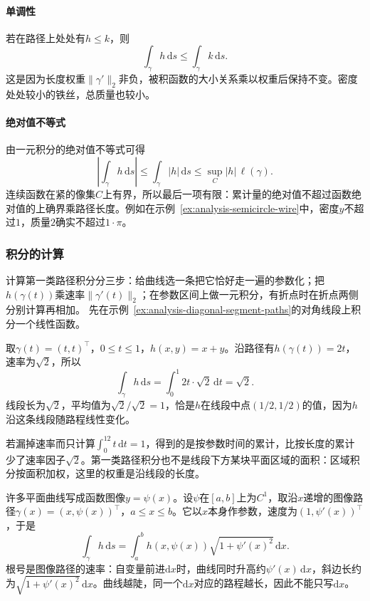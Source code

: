 \paragraph{单调性}

若在路径上处处有$h\leq k$，则
\[
 \int_\gamma h\,\mathrm ds\leq\int_\gamma k\,\mathrm ds.
\]
这是因为长度权重$\lVert\gamma'\rVert_2$非负，被积函数的大小关系乘以权重后保持不变。密度处处较小的铁丝，总质量也较小。

\paragraph{绝对值不等式}

由一元积分的绝对值不等式可得
\[
 \left|\int_\gamma h\,\mathrm ds\right|
 \leq\int_\gamma|h|\,\mathrm ds
 \leq\sup_C|h|\,\ell(\gamma).
\]
连续函数在紧的像集$C$上有界，所以最后一项有限：累计量的绝对值不超过函数绝对值的上确界乘路径长度。例如在示例~\ref{ex:analysis-semicircle-wire}中，密度$y$不超过$1$，质量$2$确实不超过$1\cdot\pi$。

\subsubsection{积分的计算}

计算第一类路径积分分三步：给曲线选一条把它恰好走一遍的参数化；把$h(\gamma(t))$乘速率$\lVert\gamma'(t)\rVert_2$；在参数区间上做一元积分，有折点时在折点两侧分别计算再相加。
先在示例~\ref{ex:analysis-diagonal-segment-paths}的对角线段上积分一个线性函数。
\begin{example}[沿对角线段积分$x+y$]
取$\gamma(t)=(t,t)^\top$，$0\leq t\leq1$，$h(x,y)=x+y$。沿路径有$h(\gamma(t))=2t$，速率为$\sqrt2$，所以
\[
 \int_\gamma h\,\mathrm ds=\int_0^1 2t\cdot\sqrt2\,\mathrm dt=\sqrt2.
\]
线段长为$\sqrt2$，平均值为$\sqrt2/\sqrt2=1$，恰是$h$在线段中点$(1/2,1/2)$的值，因为$h$沿这条线段随路程线性变化。
\end{example}
若漏掉速率而只计算$\int_0^12t\,\mathrm dt=1$，得到的是按参数时间的累计，比按长度的累计少了速率因子$\sqrt2$。第一类路径积分也不是线段下方某块平面区域的面积：区域积分按面积加权，这里的权重是沿线段的长度。

许多平面曲线写成函数图像$y=\psi(x)$。设$\psi$在$[a,b]$上为$C^1$，取沿$x$递增的图像路径$\gamma(x)=(x,\psi(x))^\top$，$a\leq x\leq b$。它以$x$本身作参数，速度为$(1,\psi'(x))^\top$，于是
\[
 \int_\gamma h\,\mathrm ds
 =\int_a^b h(x,\psi(x))\sqrt{1+\psi'(x)^2}\,\mathrm dx.
\]
根号是图像路径的速率：自变量前进$\mathrm dx$时，曲线同时升高约$\psi'(x)\,\mathrm dx$，斜边长约为$\sqrt{1+\psi'(x)^2}\,\mathrm dx$。曲线越陡，同一个$\mathrm dx$对应的路程越长，因此不能只写$\mathrm dx$。

